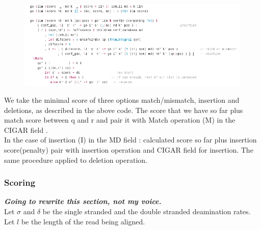 \documentclass[11pt,a4paper]{report}
\begin{document}
\begin{figure}[H]
\centering
\includegraphics[width=15cm]{pictures/A_HS.png}
\label{formula}
\end{figure}


We take the minimal score of three options match/mismatch, insertion and 
deletions, as described in the above code.
The score that we have so far plus match score between q and r and pair it 
with Match operation (M) in the CIGAR field \cite{samtools}.\\
In the case of insertion (I) in the MD field \cite{samtools}: 
calculated score so far plus insertion score(penalty) pair with insertion
operation and CIGAR field for insertion.
The same procedure applied to deletion operation.

 
\subsubsection{Scoring} \label{Scoring}

\textbf{\emph{Going to rewrite this section, not my voice.}}
\\

Let $\sigma$ and $\delta$ be the single stranded and the double stranded
deamination rates.  Let $l$ be the length of the read being aligned.  
\end{document}
